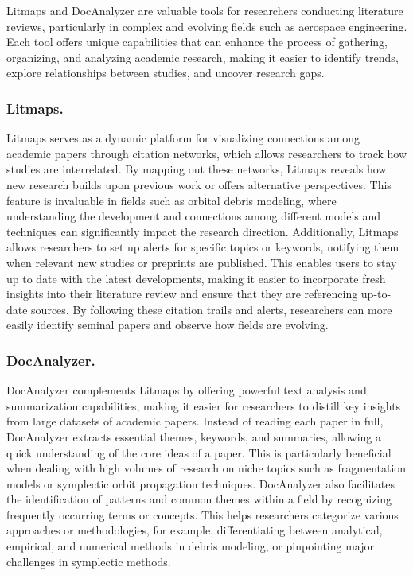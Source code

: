 \documentclass[journal ]{new-aiaa}
\begin{document}
Litmaps and DocAnalyzer are valuable tools for researchers conducting literature reviews, particularly in complex and evolving fields such as aerospace engineering. Each tool offers unique capabilities that can enhance the process of gathering, organizing, and analyzing academic research, making it easier to identify trends, explore relationships between studies, and uncover research gaps.

\subsubsection{Litmaps.}

Litmaps serves as a dynamic platform for visualizing connections among academic papers through citation networks, which allows researchers to track how studies are interrelated. By mapping out these networks, Litmaps reveals how new research builds upon previous work or offers alternative perspectives. This feature is invaluable in fields such as orbital debris modeling, where understanding the development and connections among different models and techniques can significantly impact the research direction. Additionally, Litmaps allows researchers to set up alerts for specific topics or keywords, notifying them when relevant new studies or preprints are published. This enables users to stay up to date with the latest developments, making it easier to incorporate fresh insights into their literature review and ensure that they are referencing up-to-date sources. By following these citation trails and alerts, researchers can more easily identify seminal papers and observe how fields are evolving.

\subsubsection{DocAnalyzer.}

DocAnalyzer complements Litmaps by offering powerful text analysis and summarization capabilities, making it easier for researchers to distill key insights from large datasets of academic papers. Instead of reading each paper in full, DocAnalyzer extracts essential themes, keywords, and summaries, allowing a quick understanding of the core ideas of a paper. This is particularly beneficial when dealing with high volumes of research on niche topics such as fragmentation models or symplectic orbit propagation techniques. DocAnalyzer also facilitates the identification of patterns and common themes within a field by recognizing frequently occurring terms or concepts. This helps researchers categorize various approaches or methodologies, for example, differentiating between analytical, empirical, and numerical methods in debris modeling, or pinpointing major challenges in symplectic methods.
\end{document}
